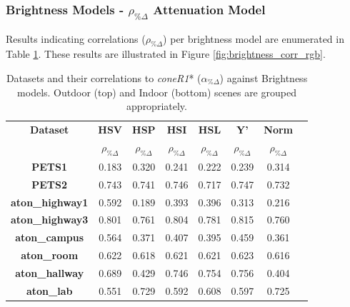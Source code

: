 \subsubsection{Brightness Models - $\rho_{\%\Delta}$ Attenuation Model}

Results indicating correlations ($\rho_{\%\Delta}$) per brightness model are enumerated in Table \ref{table:brightness_corr_rgb}. These results are illustrated in Figure \ref{fig:brightness_corr_rgb}.

\begin{table}
\centering
\caption{Datasets and their correlations to \textit{coneR1}* ($\alpha_{\%\Delta}$) against Brightness models. Outdoor (top) and Indoor (bottom) scenes are grouped appropriately.}
\begin{tabular}{ |c|c|c|c|c|c|c|c| }
	\hline
	\textbf{Dataset} & \textbf{HSV} & \textbf{HSP} & \textbf{HSI} & \textbf{HSL}& \textbf{Y'} & \textbf{Norm} \\
	\textbf{} & $\rho_{\%\Delta}$ & $\rho_{\%\Delta}$ & $\rho_{\%\Delta}$ & $\rho_{\%\Delta}$ & $\rho_{\%\Delta}$ & $\rho_{\%\Delta}$ \\
	\hline
	\hline
	\textbf{PETS1} & 0.183 & 0.320 & 0.241 & 0.222 & 0.239 & 0.314 \\
	\hline
	\textbf{PETS2} & 0.743 & 0.741 & 0.746 & 0.717 & 0.747 & 0.732 \\
	\hline
	\textbf{aton\_highway1} & 0.592 & 0.189 & 0.393 & 0.396 & 0.313 & 0.216 \\
	\hline
	\textbf{aton\_highway3} & 0.801 & 0.761 & 0.804 & 0.781 & 0.815 & 0.760 \\
	\hline
	\textbf{aton\_campus} & 0.564 & 0.371 & 0.407 & 0.395 & 0.459 & 0.361 \\
	\hline
	\hline
	\textbf{aton\_room} & 0.622 & 0.618 & 0.621 & 0.621 & 0.623 & 0.616 \\
	\hline
	\textbf{aton\_hallway} & 0.689 & 0.429 & 0.746 & 0.754 & 0.756 & 0.404 \\
	\hline
	\textbf{aton\_lab} & 0.551 & 0.729 & 0.592 & 0.608 & 0.597 & 0.725 \\
	\hline
\end{tabular}

\label{table:brightness_corr_rgb}
\end{table}

